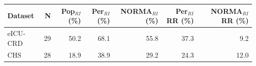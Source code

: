 \begin{table}[ht]
\centering
\footnotesize
\begin{tabular}{lrrrrrr}
\toprule
Dataset & N & Pop$_{RI}$ (\%) & Per$_{RI}$ (\%) & NORMA$_{RI}$ (\%) & Per$_{RI}$ RR (\%) & NORMA$_{RI}$ RR (\%) \\
\midrule
eICU-CRD & 29 & 50.2 & 68.1 & 55.8 & 37.3 & 9.2 \\
CHS & 28 & 18.9 & 38.9 & 29.2 & 24.3 & 12.0 \\
\bottomrule
\end{tabular}
\label{tab:prevalence}
\end{table}